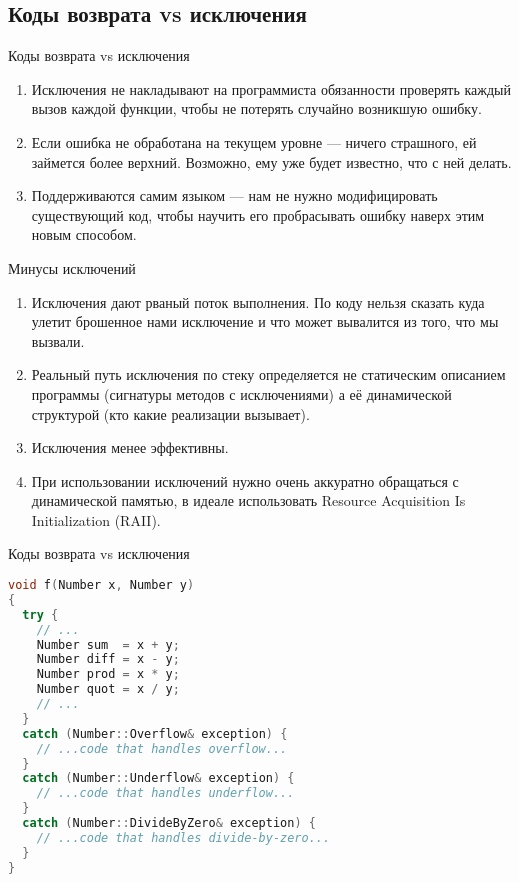 \documentclass[10pt]{beamer}
\begin{document}
\subsection{Коды возврата vs исключения}
\begin{frame}[fragile]{Коды возврата vs исключения}
\begin{enumerate}
\item Исключения не накладывают на программиста обязанности проверять каждый вызов каждой функции, чтобы не потерять случайно возникшую ошибку.
\item Если ошибка не обработана на текущем уровне — ничего страшного, ей займется более верхний. Возможно, ему уже будет известно, что с ней делать.
\item Поддерживаются самим языком — нам не нужно модифицировать существующий код, чтобы научить его пробрасывать ошибку наверх этим новым способом.
\end{enumerate}
\end{frame}

\begin{frame}[fragile]{Минусы исключений}
\begin{enumerate}
\item Исключения дают рваный поток выполнения. По коду нельзя сказать куда улетит брошенное нами исключение и что может вывалится из того, что мы вызвали.
\item Реальный путь исключения по стеку определяется не статическим описанием программы (сигнатуры методов с исключениями) а её динамической структурой (кто какие реализации вызывает).
\item Исключения менее эффективны.
\item При использовании исключений нужно очень аккуратно обращаться с динамической памятью, в идеале использовать Resource Acquisition Is Initialization (RAII).
\end{enumerate}
\end{frame}

\begin{frame}[fragile]{Коды возврата vs исключения}
\begin{lstlisting}[language=C++]
void f(Number x, Number y)
{
  try {
    // ...
    Number sum  = x + y;
    Number diff = x - y;
    Number prod = x * y;
    Number quot = x / y;
    // ...
  }
  catch (Number::Overflow& exception) {
    // ...code that handles overflow...
  }
  catch (Number::Underflow& exception) {
    // ...code that handles underflow...
  }
  catch (Number::DivideByZero& exception) {
    // ...code that handles divide-by-zero...
  }
}
\end{lstlisting}
\end{frame}
\end{document}
